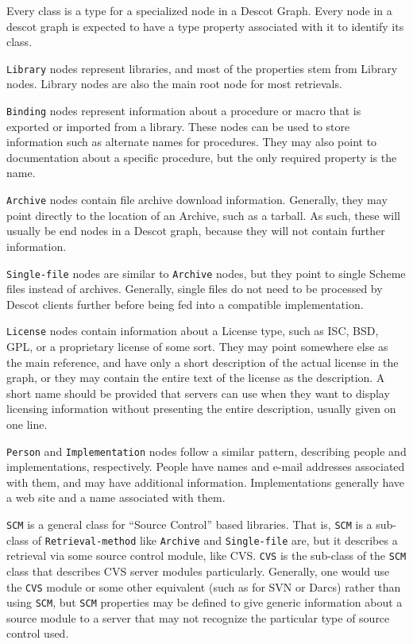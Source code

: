 \documentclass[9pt,cm,twocolumn,preprint]{sigplanconf}
\begin{document}
Every class is a type for a specialized node in a Descot Graph. 
Every node in a descot graph is expected to have a type property 
associated with it to identify its class. 

{\tt Library} nodes represent libraries, and most of the properties 
stem from Library nodes. 
Library nodes are also the main root node for most retrievals. 

{\tt Binding} nodes represent information about a procedure or macro 
that is exported or imported from a library. 
These nodes can be used to store information such as alternate names 
for procedures. 
They may also point to documentation about a specific procedure, 
but the only required property is the name. 

{\tt Archive} nodes contain file archive download information. Generally, they 
may point directly to the location of an Archive, such as a tarball. 
As such, these will usually be end nodes in a Descot graph, because they 
will not contain further information. 

{\tt Single-file} nodes are similar to {\tt Archive} nodes, 
but they point to single Scheme files instead of archives. 
Generally, single files do not need to be processed by Descot 
clients further before being fed into a compatible implementation. 

{\tt License} nodes contain information about a License type,  
such as ISC, BSD, GPL, or a proprietary license of some sort. 
They may point somewhere else as the main reference, and have 
only a short description of the actual license in the graph, 
or they may contain the entire text of the license as the 
description. 
A short name should be provided that servers can use when they 
want to display licensing information 
without presenting the entire description, 
usually given on one line. 

{\tt Person} and {\tt Implementation} nodes follow a similar 
pattern, describing people and implementations, respectively. 
People have names and e-mail addresses associated with them, 
and may have additional information. Implementations generally 
have a web site and a name associated with them. 

{\tt SCM} is a general class for ``Source Control'' based 
libraries. That is, {\tt SCM} is a sub-class of {\tt Retrieval-method} 
like {\tt Archive} and {\tt Single-file} are, but it describes 
a retrieval via some source control module, like CVS. {\tt CVS} 
is the sub-class of the {\tt SCM} class that describes CVS 
server modules particularly. Generally, one would use the {\tt CVS} 
module or some other equivalent (such as for SVN or Darcs) rather 
than using {\tt SCM}, but {\tt SCM} properties may be defined to 
give generic information about a source module to a server that 
may not recognize the particular type of source control used. 
\end{document}
